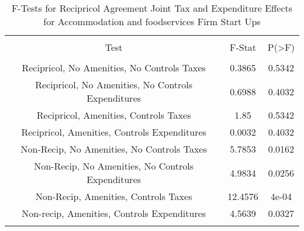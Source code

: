 
\begin{table}[!htbp] \centering 
  \caption{F-Tests for Recipricol Agreement Joint Tax and Expenditure Effects for Accommodation and foodservices Firm Start Ups} 
  \label{72Ftests} 
\begin{tabular}{@{\extracolsep{5pt}} ccc} 
\\[-1.8ex]\hline 
\hline \\[-1.8ex] 
Test & F-Stat & P(\textgreater F) \\ 
\hline \\[-1.8ex] 
Recipricol, No Amenities, No Controls Taxes & 0.3865 & 0.5342 \\ 
Recipricol, No Amenities, No Controls Expenditures & 0.6988 & 0.4032 \\ 
Recipricol, Amenities, Controls Taxes & 1.85 & 0.5342 \\ 
Recipricol, Amenities, Controls Expenditures & 0.0032 & 0.4032 \\ 
Non-Recip, No Amenities, No Controls Taxes & 5.7853 & 0.0162 \\ 
Non-Recip, No Amenities, No Controls Expenditures & 4.9834 & 0.0256 \\ 
Non-Recip, Amenities, Controls Taxes & 12.4576 & 4e-04 \\ 
Non-recip, Amenities, Controls Expenditures & 4.5639 & 0.0327 \\ 
\hline \\[-1.8ex] 
\end{tabular} 
\end{table} 
